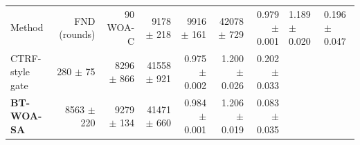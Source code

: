 \begin{tabular}{lrrrrrr}
\toprule
Method & FND (rounds) & 90 %
\midrule
WOA-C & 9178 $\pm$ 218 & 9916 $\pm$ 161 & 42078 $\pm$ 729 & 0.979 $\pm$ 0.001 & 1.189 $\pm$ 0.020 & 0.196 $\pm$ 0.047 \\
CTRF-style gate & 280 $\pm$ 75 & 8296 $\pm$ 866 & 41558 $\pm$ 921 & 0.975 $\pm$ 0.002 & 1.200 $\pm$ 0.026 & 0.202 $\pm$ 0.033 \\
\textbf{BT-WOA-SA} & 8563 $\pm$ 220 & 9279 $\pm$ 134 & 41471 $\pm$ 660 & 0.984 $\pm$ 0.001 & 1.206 $\pm$ 0.019 & 0.083 $\pm$ 0.035 \\
\bottomrule
\end{tabular}